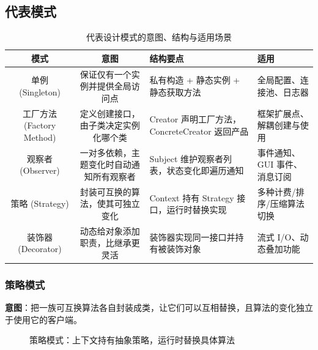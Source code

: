 \subsection{代表模式}

\begin{table}[H]
\centering
\caption{代表设计模式的意图、结构与适用场景}
\begin{tabulary}{\textwidth}{CCLL}
\toprule
模式 & 意图 & 结构要点 & 适用 \\
\midrule
单例 (Singleton) & 保证仅有一个实例并提供全局访问点 & 私有构造 + 静态实例 + 静态获取方法 & 全局配置、连接池、日志器 \\
工厂方法 (Factory Method) & 定义创建接口，由子类决定实例化哪个类 & Creator 声明工厂方法，ConcreteCreator 返回产品 & 框架扩展点、解耦创建与使用 \\
观察者 (Observer) & 一对多依赖，主题变化时自动通知所有观察者 & Subject 维护观察者列表，状态变化即遍历通知 & 事件通知、GUI 事件、消息订阅 \\
策略 (Strategy) & 封装可互换的算法，使其可独立变化 & Context 持有 Strategy 接口，运行时替换实现 & 多种计费/排序/压缩算法切换 \\
装饰器 (Decorator) & 动态给对象添加职责，比继承更灵活 & 装饰器实现同一接口并持有被装饰对象 & 流式 I/O、动态叠加功能 \\
\bottomrule
\end{tabulary}
\end{table}

\subsubsection{策略模式}

\textbf{意图}：把一族可互换算法各自封装成类，让它们可以互相替换，且算法的变化独立于使用它的客户端。

\begin{figure}[H]
\centering
{}
\caption{策略模式：上下文持有抽象策略，运行时替换具体算法}
\end{figure}

